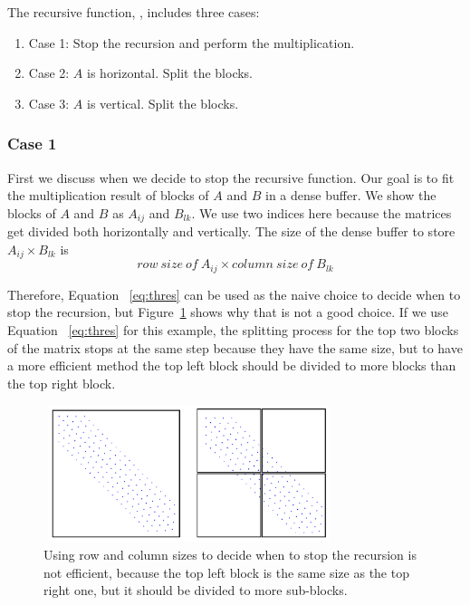 The recursive function, \recmm, includes three cases:
\begin{enumerate}
 \item Case 1: Stop the recursion and perform the multiplication.
 \item Case 2: $A$ is horizontal. Split the blocks.
 \item Case 3: $A$ is vertical. Split the blocks.
\end{enumerate}

\subsubsection{Case 1}
\label{sec:case1}
First we discuss when we decide to stop the recursive function.  
Our goal is to fit the multiplication result of blocks of $A$ and $B$ in a dense buffer. We show the blocks of $A$ and $B$ as $A_{ij}$ and $B_{lk}$. We use two indices here because the matrices get divided both horizontally and vertically. The size of the dense buffer to store $A_{ij} \times B_{lk}$ is
\begin{equation}
    row\ size\ of\ A_{ij} \times column\ size\ of\ B_{lk}\label{eq:thres}
\end{equation}

Therefore, Equation~ \eqref{eq:thres} can be used as the naive choice to decide when to stop the recursion, but Figure~\ref{fig:thres} shows why that is not a good choice. If we use Equation~ \eqref{eq:thres} for this example, the splitting process for the top two blocks of the matrix stops at the same step because they have the same size, but to have a more efficient method the top left block should be divided to more blocks than the top right block.

\begin{figure}[tbh]
 \centering
 \includegraphics[width=8.5cm,height=4cm]{./figures/split3.pdf}
 \caption{Using row and column sizes to decide when to stop the recursion is not efficient, because the top left block is the same size as the top right one, but it should be divided to more sub-blocks.}
 \label{fig:thres}
\end{figure}

